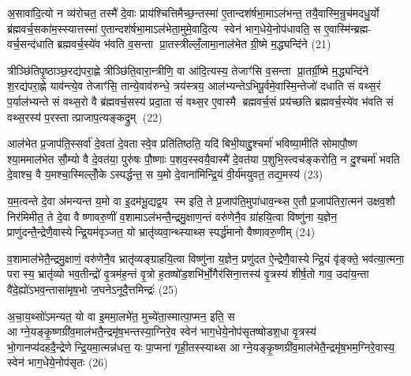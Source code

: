 {\anuvakamend[{स॒ङ्ग्रा॒मे तेनाल॑मभिमाति॒घ्ने ल॒लामं॑ प्राशृ॒ङ्गमैनं॒ पञ्च॑दश च।3।}]}

अ॒सावा॑दि॒त्यो न व्य॑रोचत॒ तस्मै॑ दे॒वाः प्राय॑श्चित्तिमैच्छ॒न्तस्मा॑ ए॒तान्दश॑र्\mbox{}षभा॒माऽल॑भन्त॒ तयै॒वास्मि॒न्रुच॑मदधु॒र्यो ब्र॑ह्मवर्च॒सका॑म॒स्स्यात्तस्मा॑ ए॒तान्दश॑र्\mbox{}षभा॒माऽल॑भेता॒मुमे॒वादि॒त्य स्वेन॑ भाग॒धेये॒नोप॑धावति॒ स ए॒वास्मि॑न्ब्रह्म- वर्च॒सन्द॑धाति ब्रह्मवर्च॒स्ये॑व भ॑वति व॒सन्ता प्रा॒तस्त्रील्लँ॒लामा॒नाल॑भेत ग्री॒ष्मे म॒द्ध्यन्दि॑ने (21)

त्रीञ्छि॑तिपृ॒ष्ठाञ्छ॒रद्य॑परा॒ह्णे त्रीञ्छि॑ति॒वारा॒न्त्रीणि॒ वा आ॑दि॒त्यस्य॒ तेजाꣳ॑सि व॒सन्ता प्रा॒तर्ग्री॒ष्मे म॒द्ध्यन्दि॑ने श॒रद्य॑परा॒ह्णे याव॑न्त्ये॒व तेजाꣳ॑सि॒ तान्ये॒वाव॑रुन्धे॒ त्रय॑स्त्रय॒ आल॑भ्यन्तेऽभिपू॒र्वमे॒वास्मि॒न्तेजो॑ दधाति सं वथ्स॒रं प॒र्याल॑भ्यन्ते सं वथ्स॒रो वै ब्र॑ह्मवर्च॒सस्य॑ प्रदा॒ता सं॑ वथ्स॒र ए॒वास्मै ब्रह्मवर्च॒सं प्रय॑च्छति ब्रह्मवर्च॒स्ये॑व भ॑वति सं वथ्स॒रस्य॑ प॒रस्तात्प्राजाप॒त्यङ्कद्रुम् (22)

आल॑भेत प्र॒जाप॑ति॒स्सर्वा॑ दे॒वता॑ दे॒वतास्वे॒व प्रति॑तिष्ठति॒ यदि॑ बिभी॒याद्दु॒श्चर्मा॑ भविष्या॒मीति॑ सोमापौ॒ष्ण श्या॒ममाल॑भेत सौ॒म्यो वै दे॒वत॑या॒ पुरु॑षः पौ॒ष्णाः प॒शव॒स्स्वयै॒वास्मै॑ दे॒वत॑या प॒शुभि॒स्त्वच॑ङ्करोति॒ न दु॒श्चर्मा॑ भवति दे॒वाश्च॒ वै य॒मश्चा॒स्मिल्लोँ॒केऽस्पर्द्धन्त॒ स य॒मो दे॒वाना॑मिन्द्रि॒यं वी॒र्य॑मयुवत॒ तद्य॒मस्य॑ (23)

य॒म॒त्वन्ते दे॒वा अ॑मन्यन्त य॒मो वा इ॒दम॑भू॒द्यद्व॒य स्म इति॒ ते प्र॒जाप॑ति॒मुपा॑धाव॒न्थ्स ए॒तौ प्र॒जाप॑तिरा॒त्मन॑ उक्षव॒शौ निर॑मिमीत॒ ते दे॒वा वैष्णावरु॒णीं व॒शामाऽल॑भन्तै॒न्द्रमु॒क्षाण॒न्तं वरु॑णेनै॒व ग्रा॑हयि॒त्वा विष्णु॑ना य॒ज्ञेन॒ प्राणु॑दन्तै॒न्द्रेणै॒वास्येन्द्रि॒यम॑वृञ्जत॒ यो भ्रातृ॑व्यवा॒न्थ्स्याथ्स स्पर्द्ध॑मानो वैष्णावरु॒णीम् (24)

व॒शामाल॑भेतै॒न्द्रमु॒क्षाणं॒ वरु॑णेनै॒व भ्रातृ॑व्यङ्ग्राहयि॒त्वा विष्णु॑ना य॒ज्ञेन॒ प्रणु॑दत ऐ॒न्द्रेणै॒वास्येन्द्रि॒यं वृ॑ङ्क्ते॒ भव॑त्या॒त्मना॒ परास्य॒ भ्रातृ॑व्यो भव॒तीन्द्रो॑ वृ॒त्रम॑ह॒न्तं वृ॒त्रो ह॒तष्षो॑ड॒शभि॑र्भो॒गैर॑सिना॒त्तस्य॑ वृ॒त्रस्य॑ शीर्\mbox{}ष॒तो गाव॒ उदा॑य॒न्ता वै॑दे॒ह्यो॑ऽभव॒न्तासा॑मृष॒भो ज॒घनेऽनूदै॒त्तमिन्द्रः॑ (25)

अ॒चा॒य॒थ्सो॑ऽमन्यत॒ यो वा इ॒ममा॒लभे॑त॒ मुच्ये॑ता॒स्मात्पा॒प्मन॒ इति॒ स आग्ने॒यङ्कृ॒ष्णग्री॑व॒माल॑भतै॒न्द्रमृ॑ष॒भन्तस्या॒ग्निरे॒व स्वेन॑ भाग॒धेये॒नोप॑सृतष्षोडश॒धा वृ॒त्रस्य॑ भो॒गानप्य॑दहदै॒न्द्रेणेन्द्रि॒यमा॒त्मन्न॑धत्त॒ यः पा॒प्मना॑ गृही॒तस्स्याथ्स आग्ने॒यङ्कृ॒ष्णग्री॑व॒माल॑भेतै॒न्द्रमृ॑ष॒भम॒ग्निरे॒वास्य॒ स्वेन॑ भाग॒धेये॒नोप॑सृतः (26)

